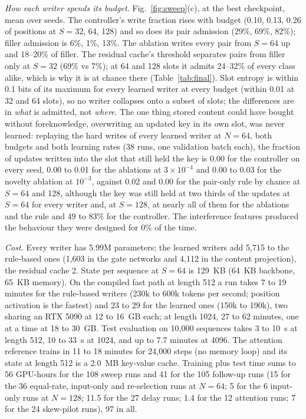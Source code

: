 \documentclass[conference]{IEEEtran}
\begin{document}
\textit{How each writer spends its budget.} Fig.~\ref{fig:sweep}(c), at the
best checkpoint, mean over seeds. The controller's write fraction rises with
budget (0.10, 0.13, 0.26 of positions at $S = 32$, 64, 128) and so does its
pair admission (29\%, 69\%, 82\%); filler admission is 6\%, 1\%, 13\%. The
ablation writes every pair from $S = 64$ up and 18--20\% of filler. The
residual cache's threshold separates pairs from filler only at $S = 32$ (69\%
vs 7\%); at 64 and 128 slots it admits 24--32\% of every class alike, which is
why it is at chance there (Table~\ref{tab:final}). Slot entropy is within 0.1
bits of its maximum for every learned writer at every budget (within 0.01 at
32 and 64 slots), so no writer collapses onto a subset of slots; the differences are in \emph{what} is
admitted, not \emph{where}. The one thing stored content could have bought
without foreknowledge, overwriting an updated key in its own slot, was never
learned: replaying the hard writes of every learned writer at $N = 64$, both
budgets and both learning rates (38 runs, one validation batch each), the
fraction of updates written into the slot that still held the key is 0.00 for
the controller on every seed, 0.00 to 0.01 for the ablations at
$3 \times 10^{-4}$ and 0.00 to 0.03 for the novelty ablation at $10^{-3}$,
against 0.02 and 0.00 for the pair-only rule by chance at $S = 64$ and 128,
although the key was still held at two thirds of the updates at $S = 64$ for
every writer and, at $S = 128$, at nearly all of them for the ablations and
the rule and 49 to 83\% for the controller. The interference features
produced the behaviour they were designed for 0\% of the time.

\textit{Cost.} Every writer has 5.99M parameters; the learned writers add
5{,}715 to the rule-based ones (1{,}603 in the gate networks and 4{,}112 in the
content projection), the residual cache 2. State per sequence at $S = 64$ is
129~KB (64~KB backbone, 65~KB memory). On the compiled fast path at length 512
a run takes 7 to 19 minutes for the rule-based writers (230k to 600k tokens
per second; position activation is the fastest) and 23 to 29 for the learned
ones (150k to 190k), two sharing an RTX 5090 at 12 to 16~GB each; at length
1024, 27 to 62 minutes, one at a time at 18 to 30~GB. Test evaluation on
10{,}000 sequences takes 3 to 10~s at length 512, 10 to 33~s at 1024, and up
to 7.7 minutes at 4096. The attention reference trains in 11 to 18 minutes
for 24{,}000 steps (no memory loop) and its state at length 512 is a 2.0~MB
key-value cache. Training plus test time sums to 56 GPU-hours for the 108
sweep runs and 41 for the 105 follow-up runs (15 for the 36 equal-rate,
input-only and re-selection runs at $N = 64$; 5 for the 6 input-only runs at
$N = 128$; 11.5 for the 27 delay runs; 1.4 for the 12 attention runs; 7 for
the 24 skew-pilot runs), 97 in all.
\end{document}
